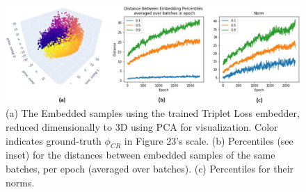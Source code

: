 \documentclass[11pt, a4paper, twoside]{article} %
\begin{document}
\begin{figure}[h!] 
     \centering 
    \includegraphics[width=0.8\linewidth]{triplet.PNG}
    \caption{ (a) The Embedded samples using the trained Triplet Loss embedder, reduced dimensionally to 3D using PCA for visualization. Color indicates ground-truth $\phi_{CR}$ in Figure 23's scale. (b) Percentiles (see inset) for the distances between embedded samples of the same batches, per epoch (averaged over batches). (c) Percentiles for their norms. }
    \label{fig:triplet}
\end{figure}\vspace{-0.4cm}
\end{document}
